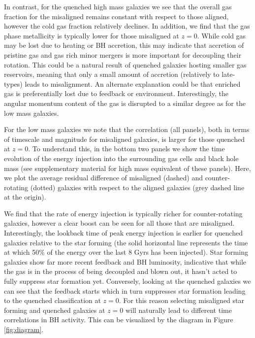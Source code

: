 \documentclass[fleqn,usenatbib]{mnras}
\begin{document}
In contrast, for the quenched high mass galaxies we see that the overall gas fraction for the misaligned remains constant with respect to those aligned, however the cold gas fraction relatively declines. In addition, we find that the gas phase metallicity is typically lower for those misaligned at $z=0$. While cold gas may be lost due to heating or BH accretion, this may indicate that accretion of pristine gas and gas rich minor mergers is more important for decoupling their rotation. This could be a natural result of quenched galaxies hosting smaller gas reservoirs, meaning that only a small amount of accretion (relatively to late-types) leads to misalignment. An alternate explanation could be that enriched gas is preferentially lost due to feedback or environment. Interestingly, the angular momentum content of the gas is disrupted to a similar degree as for the low mass galaxies.

For the low mass galaxies we note that the correlation (all panels), both in terms of timescale and magnitude for misaligned galaxies, is larger for those quenched at $z=0$. To understand this, in the bottom two panels we show the time evolution of the energy injection into the surrounding gas cells and black hole mass (see supplementary material for high mass equivalent of these panels). Here, we plot the average residual difference of misaligned (dashed) and counter-rotating (dotted) galaxies with respect to the aligned galaxies (grey dashed line at the origin). 

We find that the rate of energy injection is typically richer for counter-rotating galaxies, however a clear boost can be seen for all those that are misaligned. Interestingly, the lookback time of peak energy injection is earlier for quenched galaxies relative to the star forming (the solid horizontal line represents the time at which 50\% of the energy over the last 8 Gyrs has been injected). Star forming galaxies show far more recent feedback and BH luminosity, indicative that while the gas is in the process of being decoupled and blown out, it hasn't acted to fully suppress star formation yet. Conversely, looking at the quenched galaxies we can see that the feedback starts which in turn suppresses star formation leading to the quenched classification at $z=0$. For this reason selecting misaligned star forming and quenched galaxies at $z=0$ will naturally lead to different time correlations in BH activity. This can be visualized by the diagram in Figure \ref{fig:diagram}.
\end{document}
